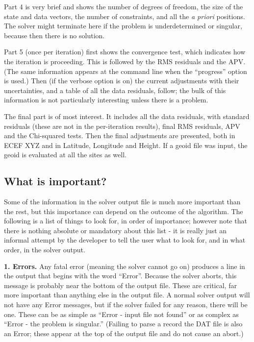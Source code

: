 Part 4 is very brief and shows the number of degrees of freedom, the size of the state and data vectors, the number of constraints, and all the \emph{a priori} positions. The solver might terminate here if the problem is underdetermined or singular, because then there is no solution.

Part 5 (once per iteration) first shows the convergence test, which indicates how the iteration is proceeding. This is followed by the RMS residuals and the APV. (The same information appears at the command line when the ``progress'' option is used.) Then (if the verbose option is on) the current adjustments with their uncertainties, and a table of all the data residuals, follow; the bulk of this information is not particularly interesting unless there is a problem.

The final part is of most interest. It includes all the data residuals, with standard residuals (these are not in the per-iteration results), final RMS residuals, APV and the Chi-squared tests. Then the final adjustments are presented, both in ECEF XYZ and in Latitude, Longitude and Height. If a geoid file was input, the geoid is evaluated at all the sites as well.

\subsection{What is important?}
Some of the information in the solver output file is much more important than the rest, but this importance can depend on the outcome of the algorithm. The following is a list of things to look for, in order of importance; however note that there is nothing absolute or mandatory about this list - it is really just an informal attempt by the developer to tell the user what to look for, and in what order, in the solver output.

\textbf{1. Errors.} Any fatal error (meaning the solver cannot go on) produces a line in the output that begins with the word ``Error''. Because the solver aborts, this message is probably near the bottom of the output file. These are critical, far more important than anything else in the output file. A normal solver output will not have any Error messages, but if the solver failed for any reason, there will be one. These can be as simple as ``Error - input file not found'' or as complex as ``Error - the problem is singular.'' (Failing to parse a record the DAT file is also an Error; these appear at the top of the output file and do not cause an abort.)

